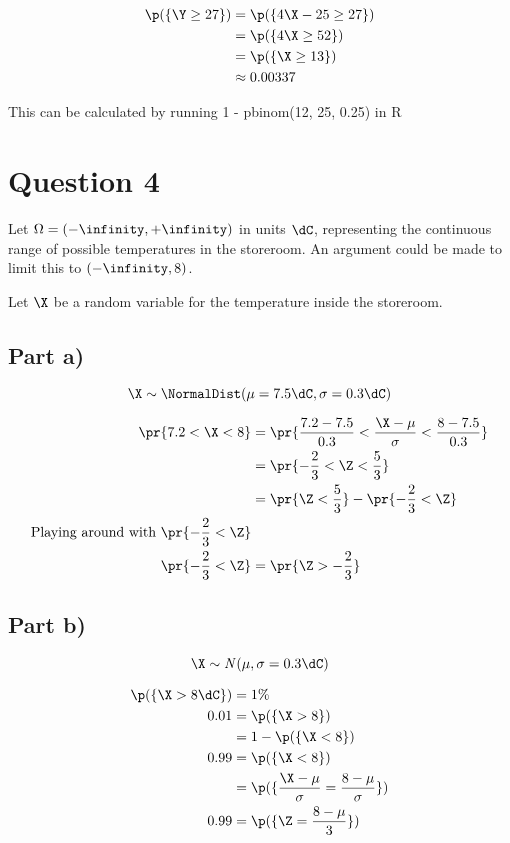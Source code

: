 \begin{align}
\p(\{ \Y \geq 27 \}) &= \p(\{ 4\X - 25 \geq 27 \}) \\
&= \p(\{ 4\X \geq 52\}) \\
&= \p(\{ \X \geq 13 \}) \\
&\approx 0.00337
\end{align}

This can be calculated by running 1 - pbinom(12, 25, 0.25) in R

\vspace{0.5cm}

\section{Question 4}

Let $\Omega = (-\infinity, +\infinity)$ in units $\dC$, representing the continuous range of possible temperatures in the storeroom.
An argument could be made to limit this to $(-\infinity, 8)$.

Let $\X$ be a random variable for the temperature inside the storeroom.

\subsection{Part a)}

\[
\X \sim \NormalDist (\mu = 7.5\dC, \sigma = 0.3\dC)
\]

\begin{align}
\pr{7.2 < \X < 8} &= \pr{\frac{7.2 - 7.5}{0.3} < \frac{\X - \mu}{\sigma} < \frac{8 - 7.5}{0.3}} \\
&= \pr{-\frac{2}{3} < \Z < \frac{5}{3}} \\
&= \pr{\Z < \frac{5}{3}} - \pr{-\frac{2}{3} < \Z} \\
\text{Playing around with } \pr{-\frac{2}{3} < \Z} \\
\pr{-\frac{2}{3} < \Z} &= \pr{\Z > -\frac{2}{3}} \\
\end{align}

\subsection{Part b)}

\[
\X \sim \mathit{N}(\mu, \sigma = 0.3 \dC)
\]

\begin{align}
\p(\{ \X > 8\dC \}) &= 1\% \\
0.01 &= \p(\{ \X > 8 \}) \\
&= 1 - \p(\{ \X < 8 \}) \\
0.99 &= \p(\{ \X < 8 \}) \\
&= \p(\{ \frac{\X - \mu}{\sigma} = \frac{8 - \mu}{\sigma}\}) \\
0.99 &= \p(\{ \Z = \frac{8 - \mu}{3}\}) \\
\end{align}

